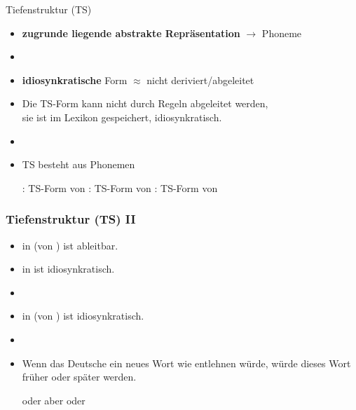 
\begin{frame}{Tiefenstruktur (TS)}
	
\begin{itemize}
	\item \textbf{zugrunde liegende abstrakte Repräsentation} $\rightarrow$ Phoneme \textipa{/ /}
	\item[]
	\item \textbf{idiosynkratische} Form $\approx$ nicht deriviert/abgeleitet
	\item Die TS-Form kann nicht durch Regeln abgeleitet werden,\\
                sie ist im Lexikon gespeichert, \dash idiosynkratisch.
	\item[]
	\item TS besteht aus Phonemen
	
	\eal
		\ex {}: TS-Form von 
		\ex {}: TS-Form von 
		\ex {}: TS-Form von 
	\zl
	
\end{itemize}
		
\end{frame}


\begin{frame}
\frametitle{Tiefenstruktur (TS) II}

\begin{itemize}
	\item \textipa{[t]} in  (von ) ist ableitbar.
	\item {} in  ist idiosynkratisch.
	\item[]
	\item {} in  (von ) ist idiosynkratisch.
	\item[]
	\item Wenn das Deutsche ein neues Wort wie  \textipa{[kOUd]} entlehnen würde, würde dieses Wort früher oder später  werden.
	
	\ea \textipa{[kOUt]} oder \textipa{[ko:t]} aber  oder  
	\z
	
\end{itemize}

\end{frame}


